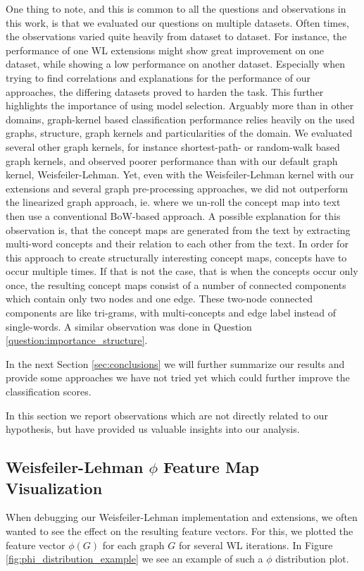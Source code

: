 One thing to note, and this is common to all the questions and observations in this work, is that we evaluated our questions on multiple datasets. Often times, the observations varied quite heavily from dataset to dataset.
For instance, the performance of one WL extensions might show great improvement on one dataset, while showing a low performance on another dataset. 
Especially when trying to find correlations and explanations for the performance of our approaches, the differing datasets proved to harden the task.
This further highlights the importance of using model selection.
Arguably more than in other domains,  graph-kernel based classification performance relies heavily on the used graphs, structure, graph kernels and particularities of the domain.
We evaluated several other graph kernels, for instance shortest-path- or random-walk based graph kernels, and observed poorer performance than with our default graph kernel, Weisfeiler-Lehman.
Yet, even with the Weisfeiler-Lehman kernel with our extensions and several graph pre-processing approaches, we did not outperform the linearized graph approach, ie. where we un-roll the concept map into text then use a conventional BoW-based approach.
A possible explanation for this observation is, that the concept maps are generated from the text by extracting multi-word concepts and their relation to each other from the text.
In order for this approach to create structurally interesting concept maps, concepts have to occur multiple times.
If that is not the case, that is when the concepts occur only once, the resulting concept maps consist of a number of connected components which contain only two nodes and one edge.
These two-node connected components are like tri-grams, with multi-concepts and edge label instead of single-words.
A similar observation was done in Question \ref{question:importance_structure}.

In the next Section \ref{sec:conclusions} we will further summarize our results and provide some approaches we have not tried yet which could further improve the classification scores.

In this section we report observations which are not directly related to our hypothesis, but have provided us valuable insights into our analysis.

\subsection{Weisfeiler-Lehman $\phi$ Feature Map Visualization}
When debugging our Weisfeiler-Lehman implementation and extensions, we often wanted to see the effect on the resulting feature vectors.
For this, we plotted the feature vector $\phi(G)$ for each graph $G$ for several WL iterations.
In Figure \ref{fig:phi_distribution_example} we see an example of such a $\phi$ distribution plot.

